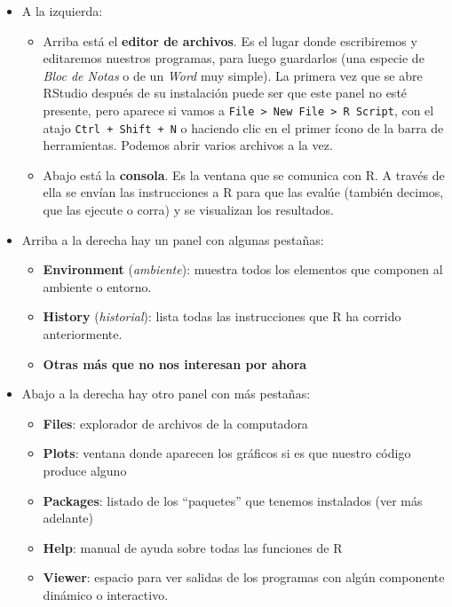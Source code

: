 \documentclass[
]{book}
\providecommand{\tightlist}{%
  \setlength{\itemsep}{0pt}\setlength{\parskip}{0pt}}
\begin{document}
\begin{itemize}
\item
  A la izquierda:

  \begin{itemize}
  \tightlist
  \item
    Arriba está el \textbf{editor de archivos}. Es el lugar donde escribiremos y editaremos nuestros programas, para luego guardarlos (una especie de \emph{Bloc de Notas} o de un \emph{Word} muy simple). La primera vez que se abre RStudio después de su instalación puede ser que este panel no esté presente, pero aparece si vamos a \texttt{File\ \textgreater{}\ New\ File\ \textgreater{}\ R\ Script}, con el atajo \texttt{Ctrl\ +\ Shift\ +\ N} o haciendo clic en el primer ícono de la barra de herramientas. Podemos abrir varios archivos a la vez.
  \item
    Abajo está la \textbf{consola}. Es la ventana que se comunica con R. A través de ella se envían las instrucciones a R para que las evalúe (también decimos, que las ejecute o corra) y se visualizan los resultados.
  \end{itemize}
\item
  Arriba a la derecha hay un panel con algunas pestañas:

  \begin{itemize}
  \tightlist
  \item
    \textbf{Environment} (\emph{ambiente}): muestra todos los elementos que componen al ambiente o entorno.
  \item
    \textbf{History} (\emph{historial}): lista todas las instrucciones que R ha corrido anteriormente.
  \item
    \textbf{Otras más que no nos interesan por ahora}
  \end{itemize}
\item
  Abajo a la derecha hay otro panel con más pestañas:

  \begin{itemize}
  \tightlist
  \item
    \textbf{Files}: explorador de archivos de la computadora
  \item
    \textbf{Plots}: ventana donde aparecen los gráficos si es que nuestro código produce alguno
  \item
    \textbf{Packages}: listado de los ``paquetes'' que tenemos instalados (ver más adelante)
  \item
    \textbf{Help}: manual de ayuda sobre todas las funciones de R
  \item
    \textbf{Viewer}: espacio para ver salidas de los programas con algún componente dinámico o interactivo.
  \end{itemize}
\end{itemize}
\end{document}
